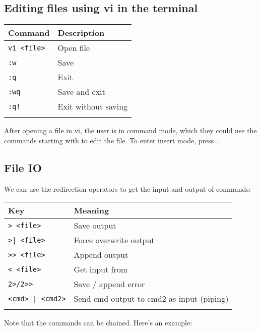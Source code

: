 \documentclass{article}
\begin{document}
\subsection{Editing files using vi in the terminal}
\begin{table}[H]
      \begin{tabular}{ll}
            \textbf{Command}      & \textbf{Description} \\ \hline
            \lstinline|vi <file>| & Open file            \\ \arrayrulecolor{lightgray}\hline
            \lstinline|:w|        & Save                 \\ \arrayrulecolor{lightgray}\hline
            \lstinline|:q|        & Exit                 \\ \arrayrulecolor{lightgray}\hline
            \lstinline|:wq|       & Save and exit        \\ \arrayrulecolor{lightgray}\hline
            \lstinline|:q!|       & Exit without saving  \\ \arrayrulecolor{lightgray}\hline
      \end{tabular}
\end{table}
After opening a file in vi, the user is in command mode, which they could use the commands starting with  to edit the file. To enter insert mode, press .

\subsection{File IO}
We can use the redirection operators to get the input and output of commands:
\begin{table}[H]
      \begin{tabular}{ll}
            \textbf{Key}               & \textbf{Meaning}                          \\ \hline
            \lstinline|> <file>|       & Save output                               \\ \arrayrulecolor{lightgray}\hline
            \lstinline+>| <file>+      & Force overwrite output                    \\ \arrayrulecolor{lightgray}\hline
            \lstinline|>> <file>|      & Append output                             \\ \arrayrulecolor{lightgray}\hline
            \lstinline|< <file>|       & Get input from                            \\ \arrayrulecolor{lightgray}\hline
            \lstinline|2>/2>>|         & Save / append error                       \\ \arrayrulecolor{lightgray}\hline
            \lstinline+<cmd> | <cmd2>+ & Send cmd output to cmd2 as input (piping) \\ \arrayrulecolor{lightgray}\hline
      \end{tabular}
\end{table}
Note that the commands can be chained. Here's an example: 
\end{document}
